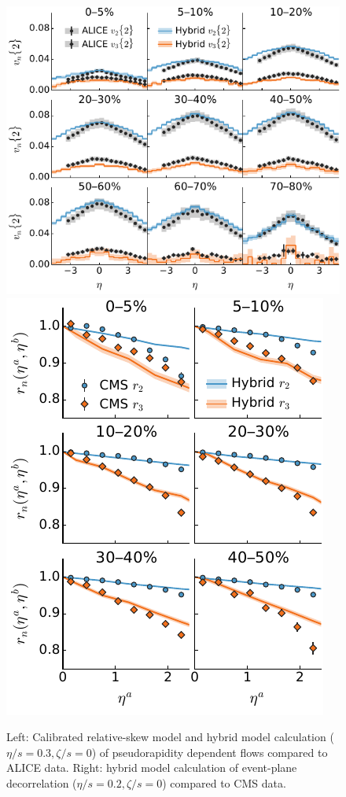 \documentclass[3p,times,twocolumn]{elsarticle}
\begin{document}
\begin{center}
\begin{figure}
\includegraphics[scale=0.86]{vn_eta.pdf}
\hfill
\includegraphics[scale=0.86]{evt_pln_decorr.pdf}
\caption{
	\label{fig:eta-obs}
	Left: Calibrated relative-skew model and hybrid model calculation ($\eta/s=0.3, \zeta/s=0$) of pseudorapidity dependent flows compared to ALICE data. Right: hybrid model calculation of event-plane decorrelation ($\eta/s=0.2, \zeta/s=0$) compared to CMS data.}
\end{figure}
\end{center}
\end{document}
